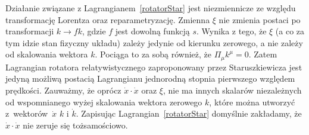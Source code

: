 Działanie związane z Lagrangianem~\eqref{rotatorStar} 
jest niezmiennicze ze względu transformację Lorentza oraz reparametryzację.
Zmienna $\xi$ nie zmienia postaci po transformacji $k \to f k$, gdzie $f$ 
jest dowolną funkcją $s$. Wynika z tego, że $\xi$ (a co za tym 
idzie stan fizyczny układu)
zależy jedynie 
od kierunku zerowego, a nie zależy od skalowania wektora $k$.
Pociąga to za sobą również, że 
$\Pi_\mu k^\mu = 0$.
Zatem Lagrangian rotatora relatywistycznego 
zaproponowany przez Staruszkiewicza jest jedyną 
możliwą postacią Lagrangianu 
jednorodną stopnia pierwszego względem prędkości.  
Zauważmy, że oprócz $\dot{x}\cdot \dot{x}$ oraz $\xi$,
nie ma innych skalarów niezależnych od wspomnianego wyżej 
skalowania wektora zerowego $k$, które można utworzyć 
z~wektorów~$\dot{x}$ $k$ i $\dot{k}$.
Zapisując Lagrangian~\eqref{rotatorStar} domyślnie zakładamy, że
$\dot{x}\cdot \dot{x}$ nie zeruje się tożsamościowo.

